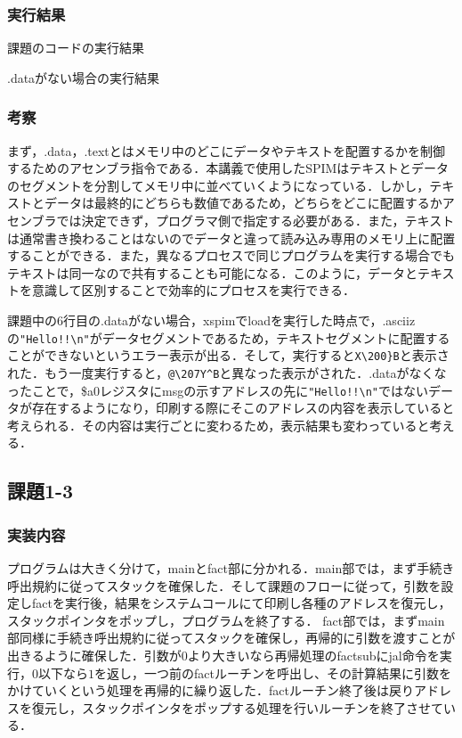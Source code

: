 \documentclass[a4j,11pt]{jarticle}
\begin{document}
\subsubsection{実行結果}
  \begin{screen}
    課題のコードの実行結果
    \end{screen}
  \begin{screen}
    .dataがない場合の実行結果
    \end{screen}
  \subsubsection{考察}
  まず，.data，.textとはメモリ中のどこにデータやテキストを配置するかを制御するためのアセンブラ指令である．本講義で使用したSPIMはテキストとデータのセグメントを分割してメモリ中に並べていくようになっている．しかし，テキストとデータは最終的にどちらも数値であるため，どちらをどこに配置するかアセンブラでは決定できず，プログラマ側で指定する必要がある．また，テキストは通常書き換わることはないのでデータと違って読み込み専用のメモリ上に配置することができる．また，異なるプロセスで同じプログラムを実行する場合でもテキストは同一なので共有することも可能になる．このように，データとテキストを意識して区別することで効率的にプロセスを実行できる．

  課題中の6行目の.dataがない場合，xspimでloadを実行した時点で，.asciizの\verb|"Hello!!\n"|がデータセグメントであるため，テキストセグメントに配置することができないというエラー表示が出る．そして，実行すると\verb|X\200}B|と表示された．もう一度実行すると，\verb|@\207Y^B|と異なった表示がされた．.dataがなくなったことで，\$a0レジスタにmsgの示すアドレスの先に\verb|"Hello!!\n"|ではないデータが存在するようになり，印刷する際にそこのアドレスの内容を表示していると考えられる．その内容は実行ごとに変わるため，表示結果も変わっていると考える．
 \subsection{課題1-3}
  \subsubsection{実装内容}
  プログラムは大きく分けて，mainとfact部に分かれる．main部では，まず手続き呼出規約に従ってスタックを確保した．そして課題のフローに従って，引数を設定しfactを実行後，結果をシステムコールにて印刷し各種のアドレスを復元し，スタックポインタをポップし，プログラムを終了する．
fact部では，まずmain部同様に手続き呼出規約に従ってスタックを確保し，再帰的に引数を渡すことが出きるように確保した．引数が$0$より大きいなら再帰処理のfactsubにjal命令を実行，$0$以下なら$1$を返し，一つ前のfactルーチンを呼出し、その計算結果に引数をかけていくという処理を再帰的に繰り返した．factルーチン終了後は戻りアドレスを復元し，スタックポインタをポップする処理を行いルーチンを終了させている．
\end{document}
